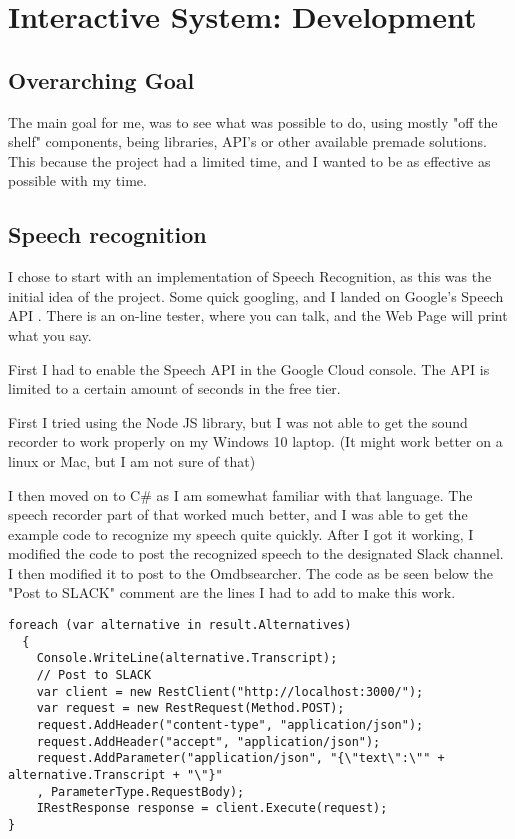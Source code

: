 \documentclass[11pt,fleqn]{book} %
\begin{document}
\chapter{Interactive System: Development}
\section{Overarching Goal}
The main goal for me, was to see what was possible to do, using mostly "off the shelf" components, being libraries, API's or other available premade solutions. This because the project had a limited time, and I wanted to be as effective as possible with my time.
\section{Speech recognition}
I chose to start with an implementation of Speech Recognition, as this was the initial idea of the project.
Some quick googling, and I landed on Google's Speech API \cite{GoogleCloudPlatformSpeechPlatform}. There is an on-line tester, where you can talk, and the Web Page will print what you say.

First I had to enable the Speech API in the Google Cloud console. The API is limited to a certain amount of seconds in the free tier.

First I tried using the Node JS library, but I was not able to get the sound recorder to work properly on my Windows 10 laptop. (It might work better on a linux or Mac, but I am not sure of that)

I then moved on to C\# as I am somewhat familiar with that language. The speech recorder part of that worked much better, and I was able to get the example code to recognize my speech quite quickly.
After I got it working, I modified the code to post the recognized speech to the designated Slack channel. I then modified it to post to the Omdbsearcher. 
\newpage
The code as be seen below the "Post to SLACK" comment are the lines I had to add to make this work.
\begin{verbatim}
foreach (var alternative in result.Alternatives)
  {
    Console.WriteLine(alternative.Transcript);
    // Post to SLACK
    var client = new RestClient("http://localhost:3000/");
    var request = new RestRequest(Method.POST);
    request.AddHeader("content-type", "application/json");
    request.AddHeader("accept", "application/json");
    request.AddParameter("application/json", "{\"text\":\"" + alternative.Transcript + "\"}"
    , ParameterType.RequestBody);
    IRestResponse response = client.Execute(request);
}
\end{verbatim}
\end{document}

